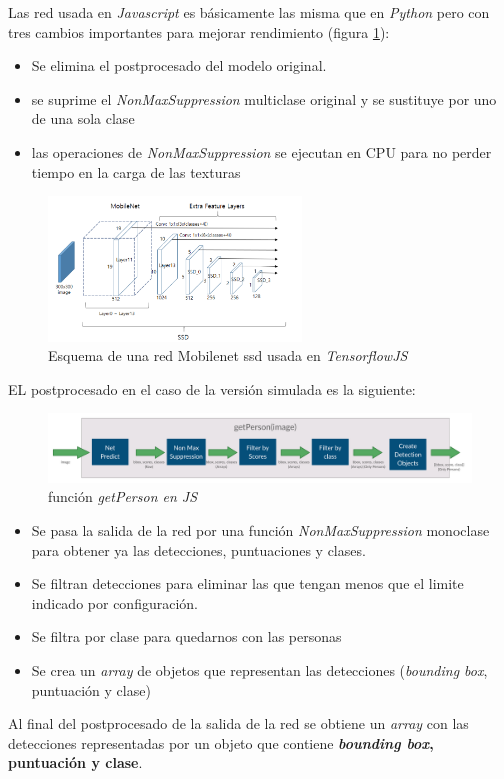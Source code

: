 Las red usada en \textit{Javascript} es básicamente las misma que en \textit{Python} pero con tres cambios importantes para mejorar rendimiento (figura \ref{fig:mobilenet2}):
\begin{itemize}
  \item Se elimina el postprocesado del modelo original.
  \item se suprime el \textit{NonMaxSuppression} multiclase original y se sustituye por uno de una sola clase
  \item las operaciones de \textit{NonMaxSuppression} se ejecutan en CPU para no perder tiempo en la carga de las texturas
\end{itemize}
\begin{figure}[H]
  \begin{center}
    \includegraphics[width=0.6\textwidth]{figures/simulado/mobilenet.png}
		\caption{Esquema de una red Mobilenet ssd usada en \textit{TensorflowJS}}
		\label{fig:mobilenet2}
		\end{center}
\end{figure}

EL postprocesado en el caso de la versión simulada es la siguiente:
\begin{figure}[H]
  \begin{center}
    \includegraphics[width=1\textwidth]{figures/simulado/getPersonjs.png}
		\caption{función \textit{getPerson en JS}}
		\label{fig:getPersonjs}
		\end{center}
\end{figure}
\begin{itemize}
  \item Se pasa la salida de la red por una función \textit{NonMaxSuppression} monoclase para obtener ya las detecciones, puntuaciones y clases.
  \item Se filtran detecciones para eliminar las que tengan menos que el limite indicado por configuración.
  \item Se filtra por clase para quedarnos con las personas
  \item Se crea un \textit{array} de objetos que representan las detecciones (\textit{bounding box}, puntuación y clase)
\end{itemize}
Al final del postprocesado de la salida de la red se obtiene un \textit{array} con las detecciones representadas por un objeto que contiene\textbf{ \textit{bounding box}, puntuación y clase}.

